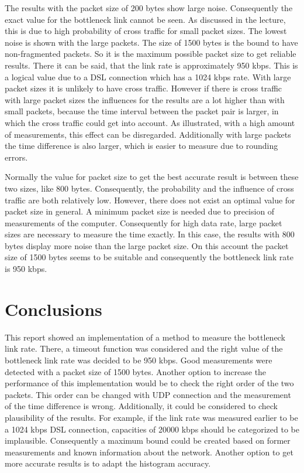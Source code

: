 The results with the packet size of 200 bytes show large noise. Consequently the exact value for the bottleneck link cannot be seen. As discussed in the lecture, this is due to high probability of cross traffic for small packet sizes. The lowest noise is shown with the large packets. The size of 1500 bytes is the bound to have non-fragmented packets. So it is the maximum possible packet size to get reliable results. There it can be said, that the link rate is approximately 950 kbps. This is a logical value due to a DSL connection which has a 1024 kbps rate. With large packet sizes it is unlikely to have cross traffic. However if there is cross traffic with large packet sizes the influences for the results are a lot higher than with small packets, because the time interval between the packet pair is larger, in which the cross traffic could get into account. As illustrated, with a high amount of measurements, this effect can be disregarded. Additionally with large packets the time difference is also larger, which is easier to measure due to rounding errors.

Normally the value for packet size to get the best accurate result is between these two sizes, like 800 bytes. Consequently, the probability and the influence of cross traffic are both relatively low. However, there does not exist an optimal value for packet size in general. A minimum packet size is needed due to precision of measurements of the computer. Consequently for high data rate, large packet sizes are necessary to measure the time exactly. In this case, the results with 800 bytes display more noise than the large packet size.  On this account the packet size of 1500 bytes seems to be suitable and consequently the bottleneck link rate is 950 kbps.


%
%
\chapter{\label{text:Kap4}Conclusions}
This report showed an implementation of a method to measure the bottleneck link rate. There, a timeout function was considered and the right value of the bottleneck link rate was decided to be 950 kbps. Good measurements were detected with a packet size of 1500 bytes. Another option to increase the performance of this implementation would be to check the right order of the two packets. This order can be changed with UDP connection and the measurement of the time difference is wrong. Additionally, it could be considered to check plausibility of the results. For example, if the link rate was measured earlier to be a 1024 kbps DSL connection, capacities of 20000 kbps should be categorized to be implausible. Consequently a maximum bound could be created based on former measurements and known information about the network. Another option to get more accurate results is to adapt the histogram accuracy.